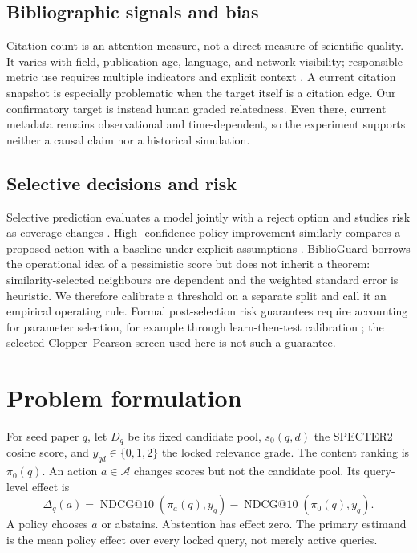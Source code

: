 \documentclass[11pt]{article}
\begin{document}
\subsection{Bibliographic signals and bias}

Citation count is an attention measure, not a direct measure of scientific quality.
It varies with field, publication age, language, and network visibility; responsible
metric use requires multiple indicators and explicit context
\citep{hicks2015leiden}.  A current citation snapshot is especially problematic when
the target itself is a citation edge.  Our confirmatory target is instead human graded
relatedness.  Even there, current metadata remains observational and time-dependent,
so the experiment supports neither a causal claim nor a historical simulation.

\subsection{Selective decisions and risk}

Selective prediction evaluates a model jointly with a reject option and studies risk
as coverage changes \citep{geifman2017selective,geifman2019selectivenet}.  High-
confidence policy improvement similarly compares a proposed action with a baseline
under explicit assumptions \citep{thomas2015hcpi}.  BiblioGuard borrows the operational
idea of a pessimistic score but does not inherit a theorem: similarity-selected
neighbours are dependent and the weighted standard error is heuristic.  We therefore
calibrate a threshold on a separate split and call it an empirical operating rule.
Formal post-selection risk guarantees require accounting for parameter selection, for
example through learn-then-test calibration \citep{angelopoulos2025learn}; the selected
Clopper--Pearson screen used here is not such a guarantee.

\section{Problem formulation}

For seed paper \(q\), let \(D_q\) be its fixed candidate pool, \(s_0(q,d)\) the
SPECTER2 cosine score, and \(y_{qd}\in\{0,1,2\}\) the locked relevance grade.  The
content ranking is \(\pi_0(q)\).  An action \(a\in\mathcal{A}\) changes scores but not
the candidate pool.  Its query-level effect is
\begin{equation}
  \Delta_q(a)=\operatorname{NDCG@10}(\pi_a(q),y_q)
  -\operatorname{NDCG@10}(\pi_0(q),y_q).
\end{equation}
A policy chooses \(a\) or abstains.  Abstention has effect zero.  The primary estimand
is the mean policy effect over every locked query, not merely active queries.
\end{document}
